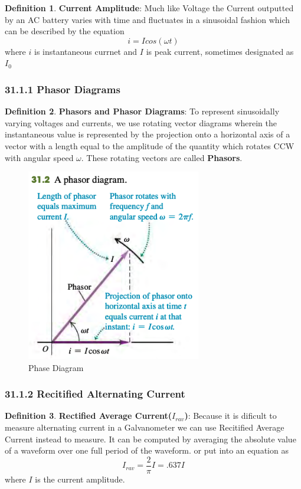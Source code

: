 \documentclass[12pt]{amsart}
\theoremstyle{definition}
\newtheorem{definition}{Definition} %
\numberwithin{equation}{theorem}    %
\begin{document}
\begin{definition}
    \textbf{Current Amplitude}:
    Much like Voltage the Current outputted by an AC battery varies with time and fluctuates in a sinusoidal fashion which can be described by the equation $$i = Icos(\omega t)$$ where $i$ is instantaneous currnet and $I$ is peak current, sometimes designated as $I_0$
\end{definition}

\subsubsection*{31.1.1 Phasor Diagrams}

\begin{definition}
    \textbf{Phasors and Phasor Diagrams}:
    To represent sinusoidally varying voltages and currents, we use rotating vector diagrams wherein the instantaneous value is represented by the projection onto a horizontal axis of a vector with a length equal to the amplitude of the quantity which rotates CCW with angular speed $\omega$. These rotating vectors are called \textbf{Phasors}.
\end{definition}

\begin{figure}[H]
    \centering
    \includegraphics[width=3in]{Media/Phasor.png}
    \caption{Phase Diagram}
    \label{Phase Diagram}
\end{figure}

\subsubsection*{31.1.2 Recitified Alternating Current}

\begin{definition}
    \textbf{Rectified Average Current($I_{rav}$)}:
    Because it is dificult to measure alternating current in a Galvanometer we can use Recitified Average Current instead to measure. It can be computed by averaging the absolute value of a waveform over one full period of the waveform. or put into an equation as $$I_{rav} = \frac{2}{\pi}I = .637I$$ where $I$ is the current amplitude.
\end{definition}
\end{document}
